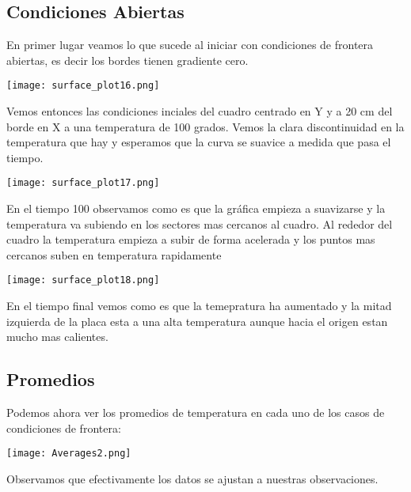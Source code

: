 \documentclass{article}
\begin{document}
\subsection{Condiciones Abiertas}
En primer lugar veamos lo que sucede al iniciar con condiciones de frontera abiertas, es decir los bordes tienen gradiente cero.\\
\centerline{\texttt{[image: surface\_plot16.png]}}
Vemos entonces las condiciones inciales del cuadro centrado en Y y a 20 cm del borde en X a una temperatura de 100 grados. Vemos la clara discontinuidad en la temperatura que hay y esperamos que la curva se suavice a medida que pasa el tiempo.\\
\centerline{\texttt{[image: surface\_plot17.png]}}
En el tiempo 100 observamos como es que la gr\'afica empieza a suavizarse y la temperatura va subiendo en los sectores mas cercanos al cuadro. Al rededor del cuadro la temperatura empieza a subir de forma acelerada y los puntos mas cercanos suben en temperatura rapidamente \\
\centerline{\texttt{[image: surface\_plot18.png]}}
En el tiempo final vemos como es que la temepratura ha aumentado y la mitad izquierda de la placa esta a una alta temperatura aunque hacia el origen estan mucho mas calientes.\\  
\subsection{Promedios}
Podemos ahora ver los promedios de temperatura en cada uno de los casos de condiciones de frontera:\\
\centerline{\texttt{[image: Averages2.png]}}
Observamos que efectivamente los datos se ajustan a nuestras observaciones.
\end{document}
